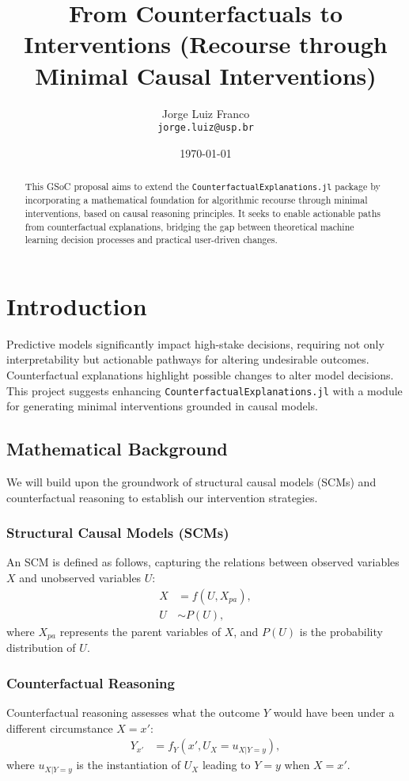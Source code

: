 \documentclass[a4paper,12pt]{article}
\title{From Counterfactuals to Interventions (Recourse through Minimal Causal Interventions)}
\author{Jorge Luiz Franco\\ \texttt{jorge.luiz@usp.br}}
\date{\today}
\begin{document}
\maketitle

\begin{abstract}
This GSoC proposal aims to extend the \texttt{CounterfactualExplanations.jl} package by incorporating a mathematical foundation for algorithmic recourse through minimal interventions, based on causal reasoning principles. It seeks to enable actionable paths from counterfactual explanations, bridging the gap between theoretical machine learning decision processes and practical user-driven changes.
\end{abstract}

\tableofcontents

\newpage

\section{Introduction}
Predictive models significantly impact high-stake decisions, requiring not only interpretability but actionable pathways for altering undesirable outcomes. Counterfactual explanations highlight possible changes to alter model decisions. This project suggests enhancing \texttt{CounterfactualExplanations.jl} with a module for generating minimal interventions grounded in causal models.

\subsection{Mathematical Background}
We will build upon the groundwork of structural causal models (SCMs) and counterfactual reasoning to establish our intervention strategies.

\subsubsection{Structural Causal Models (SCMs)}
An SCM is defined as follows, capturing the relations between observed variables $X$ and unobserved variables $U$:
\begin{align}
  X &= f(U, X_{pa}), \\
  U &\sim P(U),
\end{align}
where $X_{pa}$ represents the parent variables of $X$, and $P(U)$ is the probability distribution of $U$.

\subsubsection{Counterfactual Reasoning}
Counterfactual reasoning assesses what the outcome $Y$ would have been under a different circumstance $X=x'$:
\begin{align}
  Y_{x'} &= f_Y(x', U_X = u_{X|Y=y}),
\end{align}
where $u_{X|Y=y}$ is the instantiation of $U_X$ leading to $Y=y$ when $X=x'$.
\end{document}
